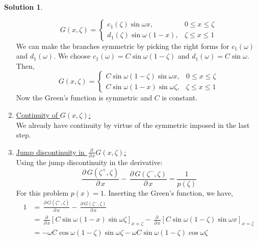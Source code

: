 \documentclass[12pt,a4paper]{article}
\theoremstyle{remark}
\theoremstyle{definition}
\newtheorem*{soln}{Solution}
\newcommand{\pardx}[1]{\,\frac{\partial\, #1}{\partial\, x}}
\begin{document}
\begin{soln}
\begin{enumerate}
              \[
                  G(x,\zeta)=\begin{cases}
                      c_1(\zeta)\sin\omega x,     & 0\leq x \leq \zeta \\
                      d_1(\zeta)\sin\omega(1- x), & \zeta\leq x \leq 1
                  \end{cases}
              \]
              We can make the branches symmetric by picking the right forms for $ c_1(\omega) $ and $ d_1(\omega) $. We choose $ c_1(\omega)=C\sin\omega(1-\zeta) $ and $ d_1(\omega)=C\sin\omega$.\\
              Then,
              \begin{equation}
                  \label{eq:greenprob1.4}
                  G(x,\zeta)=\begin{cases}
                      C\sin\omega(1-\zeta)\sin\omega x, & 0\leq x \leq \zeta \\
                      C\sin\omega(1-x)\sin \omega\zeta, & \zeta\leq x \leq 1
                  \end{cases}
              \end{equation}
              Now the Green's function is symmetric and $ C $ is constant.
        \item \underline{Continuity of $ G(x,\zeta) $:}\\
              We already have continuity by virtue of the symmetric imposed in the last step.
        \item \underline{Jump discontinuity in $ \pardx{}G(x,\zeta) $:}\\
              Using the jump discontinuity in the derivative:
              \[\pardx{G(\zeta^+,\zeta)}-\pardx{G(\zeta^-,\zeta)}=\frac{1}{p(\zeta)}\]
              For this problem $ p(x)=1 $. Inserting the Green's function, we have,
              \begin{align*}
                  1                                  & =\pardx{G(\zeta^+,\zeta)}-\pardx{G(\zeta^-,\zeta)}                                                                                  \\
                                                     & =\pardx{}\left[ C\sin\omega(1-x)\sin\omega\zeta \right]_{x=\zeta}-\pardx{}\left[ C\sin\omega(1-\zeta)\sin\omega x \right]_{x=\zeta} \\
                                                     & =-\omega C\cos\omega(1-\zeta)\sin\omega\zeta-\omega C\sin\omega(1-\zeta)\cos\omega\zeta                                             \\

\end{align*}
\end{enumerate}
\end{soln}
\end{document}
